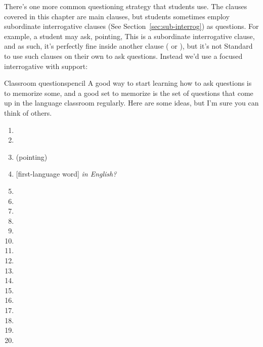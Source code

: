  There's one more common questioning strategy that students use. The clauses covered in this chapter are main clauses, but students sometimes employ subordinate interrogative clauses (See Section~\ref{sec:sub-interrog}) as questions. For example, a student may ask, pointing,  This is a subordinate interrogative clause, and as such, it's perfectly fine inside another clause ( or ), but it's not Standard to use such clauses on their own to ask questions. Instead we'd use a focused interrogative with  support: 

\begin{tblsframedsymbol}{Classroom questions}{pencil}
\setlength{\parindent}{1.5em}
    \noindent A good way to start learning how to ask questions is to memorize some, and a good set to memorize is the set of questions that come up in the language classroom regularly. Here are some ideas, but I'm sure you can think of others.

 \begin{enumerate}[noitemsep, leftmargin=*]
    \item {}
    \item {}
    \item {} (pointing)
    \item {}[first-language word]\textit{ in English?}
    \item {}
    \item {}
    \item {}
    \item {}
    \item {}
    \item {}
    \item {}
    \item {}
    \item {}
    \item {}
    \item {}
    \item {}
    \item {}
    \item {}
    \item {}
    \item {}
\end{enumerate}
\end{tblsframedsymbol}

